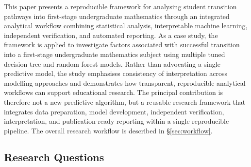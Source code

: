 This paper presents a reproducible framework for analysing student transition pathways into first-stage undergraduate mathematics through an integrated analytical workflow combining 
statistical analysis, interpretable machine learning, independent verification, and automated reporting. As a case study, the framework is applied to investigate factors 
associated with successful transition into a first-stage undergraduate mathematics subject using multiple tuned decision tree and random forest models. Rather than advocating 
a single predictive model, the study emphasises consistency of interpretation across modelling approaches and demonstrates how transparent, reproducible analytical workflows 
can support educational research. The principal contribution is therefore not a new predictive algorithm, but a reusable research framework that integrates data preparation, 
model development, independent verification, interpretation, and publication-ready reporting within a single reproducible pipeline. The overall research workflow is described in \S\ref{sec:workflow}.

\subsection{Research Questions}

